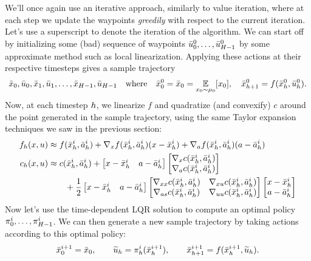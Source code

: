 \documentclass[../main/main]{subfiles}
\begin{document}
We'll once again use an iterative approach, similarly to value iteration, where at each step we update the waypoints \emph{greedily} with respect to the current iteration.
Let's use a superscript to denote the iteration of the algorithm.
We can start off by initializing some (bad) sequence of waypoints $\bar {u}^0_0, \dots, \bar {u}^0_{H-1}$ by some approximate method such as local linearization.
Applying these actions at their respective timesteps gives a sample trajectory \[
    \bar {x}_0, \bar {u}_0, \bar {x}_1, \bar {u}_1, \dots, \bar {x}_{H-1}, \bar {u}_{H-1} \quad \text{where} \quad
    \bar {x}^0_0 = \bar {x}_0 = \operatorname*{\mathbb{E}}_{x_0 \sim \mu_0} [x_0], \quad \bar {x}^0_{h+1} = f(\bar {x}^0_h, \bar {u}^0_h).
\]
Now, at each timestep $h$, we linearize $f$ and quadratize (and convexify) $c$ around the point generated in the sample trajectory, using the same Taylor expansion techniques we saw in the previous section:
\begingroup
\newcommand{\iter}[1]{\bar {#1}^i_\hi}
\newcommand{\grad}[2]{\nabla_{#2} #1(\iter \st, \iter a)}
\begin{align*}
    f_\hi(\st, \act) &\approx f(\iter \st, \iter a) + \grad f \st (\st - \iter \st) + \grad f a (a - \iter a) \\
    c_\hi(\st, \act) &\approx c(\iter \st, \iter a) + \begin{bmatrix}
        \st - \iter \st & a - \iter a
    \end{bmatrix} \begin{bmatrix}
        \grad c \st \\
        \grad c a
    \end{bmatrix} \\
    &\qquad + \frac{1}{2} \begin{bmatrix}
        \st - \iter \st & a - \iter a
    \end{bmatrix} \begin{bmatrix}
        \nabla_{\st \st} c(\iter \st, \iter a) & \nabla_{\st \act} c(\iter \st, \iter a) \\
        \nabla_{as} c(\iter \st, \iter a) & \nabla_{\act \act} c(\iter \st, \iter a)
    \end{bmatrix}
    \begin{bmatrix}
        \st - \iter \st \\
        a - \iter a
    \end{bmatrix}
\end{align*}
\endgroup
Now let's use the time-dependent LQR solution to compute an optimal policy $\pi^i_0, \dots, \pi^i_{H-1}$. We can then generate a new sample trajectory by taking actions according to this optimal policy: \[
    \bar {x}^{i+1}_0 = \bar {x}_0, \qquad \widetilde {u}_h = \pi^i_h(\bar {x}^{i+1}_h), \qquad \bar {x}^{i+1}_{h+1} = f(\bar {x}^{i+1}_h, \widetilde {u}_h).
\]
\end{document}
